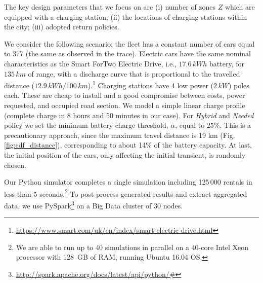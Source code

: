 The key design parameters that we focus on are (i) number of zones $Z$ which are equipped with a charging station; (ii) the locations of charging stations within the city; (iii) adopted return policies.

We consider the following scenario: the fleet has a constant number of cars equal to 377 (the same as observed in the trace).  Electric cars have the same nominal characteristics as the Smart ForTwo Electric Drive, i.e., $17.6\,kWh$ battery, for $135\,km$ of range, with a discharge curve that is proportional to the travelled distance ($12.9\,kWh/100\,km$).\footnote{\url{https://www.smart.com/uk/en/index/smart-electric-drive.html}} 
Charging stations have 4 low power ($2\,kW$) poles each. These are cheap to install and a good compromise between costs, power requested, and occupied road section. We model a simple linear charge profile (complete charge in 8 hours and 50 minutes in our case).
For \textit{Hybrid} and \textit{Needed} policy we set the minimum battery charge threshold, $\alpha$, equal to $25\%$. This is a precautionary approach, since the maximum travel distance is 19 km (Fig. \ref{fig:cdf_distance}), corresponding to about 14\% of the battery capacity.
At last, the initial position of the cars, only affecting the initial transient, is randomly chosen.

Our Python simulator
completes a single simulation including 125\,000 rentals in less than 5 seconds.\footnote{We are able to run up to 40 simulations in parallel on a 40-core Intel Xeon 
processor with 128~GB of RAM, running Ubuntu 16.04 OS.} To post-process generated results and extract aggregated data,  we use PySpark\footnote{\url{http://spark.apache.org/docs/latest/api/python/\#}} on a Big Data cluster of 30 nodes. 

